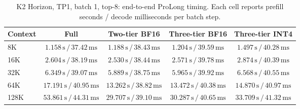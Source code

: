 \begin{table}[t]
\centering
\small
\caption{K2 Horizon, TP1, batch 1, top-8: end-to-end ProLong timing. Each cell reports prefill seconds / decode milliseconds per batch step.}
\label{tab:prolong-k2-horizon-tp1-b1-end-to-end}
\begin{tabular}{lcccc}
\toprule
Context & Full & Two-tier BF16 & Three-tier BF16 & Three-tier INT4 \\
\midrule
8K & \(1.158\,\mathrm{s}\,/\,37.42\,\mathrm{ms}\) & \(1.188\,\mathrm{s}\,/\,38.43\,\mathrm{ms}\) & \(1.204\,\mathrm{s}\,/\,39.59\,\mathrm{ms}\) & \(1.497\,\mathrm{s}\,/\,40.28\,\mathrm{ms}\) \\
16K & \(2.604\,\mathrm{s}\,/\,38.19\,\mathrm{ms}\) & \(2.530\,\mathrm{s}\,/\,38.44\,\mathrm{ms}\) & \(2.571\,\mathrm{s}\,/\,39.78\,\mathrm{ms}\) & \(2.874\,\mathrm{s}\,/\,40.39\,\mathrm{ms}\) \\
32K & \(6.349\,\mathrm{s}\,/\,39.07\,\mathrm{ms}\) & \(5.889\,\mathrm{s}\,/\,38.75\,\mathrm{ms}\) & \(5.965\,\mathrm{s}\,/\,39.92\,\mathrm{ms}\) & \(6.568\,\mathrm{s}\,/\,40.55\,\mathrm{ms}\) \\
64K & \(17.191\,\mathrm{s}\,/\,40.95\,\mathrm{ms}\) & \(13.262\,\mathrm{s}\,/\,38.82\,\mathrm{ms}\) & \(13.472\,\mathrm{s}\,/\,40.38\,\mathrm{ms}\) & \(14.870\,\mathrm{s}\,/\,40.97\,\mathrm{ms}\) \\
128K & \(53.861\,\mathrm{s}\,/\,44.31\,\mathrm{ms}\) & \(29.707\,\mathrm{s}\,/\,39.10\,\mathrm{ms}\) & \(30.287\,\mathrm{s}\,/\,40.65\,\mathrm{ms}\) & \(33.709\,\mathrm{s}\,/\,41.32\,\mathrm{ms}\) \\
\bottomrule
\end{tabular}
\end{table}

